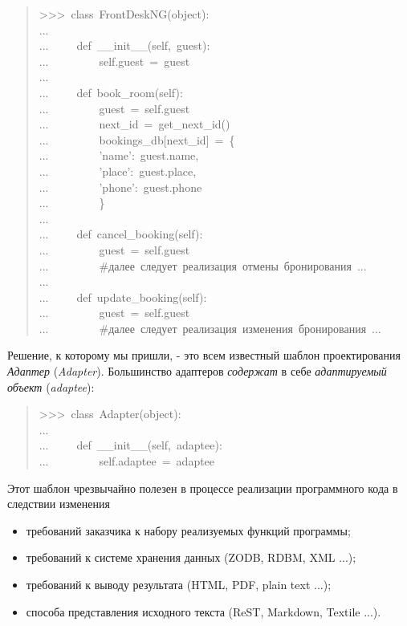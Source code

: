 \documentclass[14pt,a4paper,openany,twoside,final]{extbook}
\begin{document}
\begin{quote}{\ttfamily \raggedright \noindent
>{}>{}>~class~FrontDeskNG(object):\\
...\\
...~~~~~def~\_\_init\_\_(self,~guest):\\
...~~~~~~~~~self.guest~=~guest\\
...\\
...~~~~~def~book\_room(self):\\
...~~~~~~~~~guest~=~self.guest\\
...~~~~~~~~~next\_id~=~get\_next\_id()\\
...~~~~~~~~~bookings\_db{[}next\_id{]}~=~\{\\
...~~~~~~~~~'name':~guest.name,\\
...~~~~~~~~~'place':~guest.place,\\
...~~~~~~~~~'phone':~guest.phone\\
...~~~~~~~~~\}\\
...\\
...~~~~~def~cancel\_booking(self):\\
...~~~~~~~~~guest~=~self.guest\\
...~~~~~~~~~\#далее~следует~реализация~отмены~бронирования~...\\
...\\
...~~~~~def~update\_booking(self):\\
...~~~~~~~~~guest~=~self.guest\\
...~~~~~~~~~\#далее~следует~реализация~изменения~бронирования~...
}
\end{quote}

Решение, к которому мы пришли, - это всем известный шаблон
проектирования \emph{Адаптер} (\emph{Adapter}). Большинство адаптеров \emph{содержат}
в себе \emph{адаптируемый объект} (\emph{adaptee}):

\begin{quote}{\ttfamily \raggedright \noindent
>{}>{}>~class~Adapter(object):\\
...\\
...~~~~~def~\_\_init\_\_(self,~adaptee):\\
...~~~~~~~~~self.adaptee~=~adaptee
}
\end{quote}

Этот шаблон чрезвычайно полезен в процессе реализации программного
кода в следствии изменения

\begin{itemize}

\item требований заказчика к набору реализуемых функций программы;

\item требований к системе хранения данных (ZODB, RDBM, XML ...);

\item требований к выводу результата (HTML, PDF, plain text ...);

\item способа представления исходного текста (ReST, Markdown, Textile
...).

\end{itemize}
\end{document}
